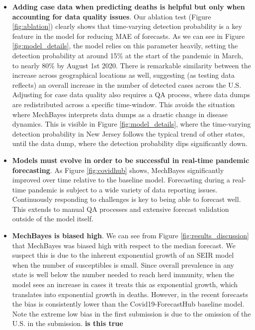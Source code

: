 \documentclass[11pt]{amsart}
\begin{document}
\begin{itemize}
\item \textbf{Adding case data when predicting deaths is helpful but only when accounting for data quality issues}. Our ablation test (Figure \ref{fig:ablation}) clearly shows that time-varying detection probability is a key feature in the model for reducing MAE of forecasts. As we can see in Figure \ref{fig:model_details}, the model relies on this parameter heavily, setting the detection probability at around 15\% at the start of the pandemic in March, to nearly 80\% by August 1st 2020. There is remarkable similarity between the increase across geographical locations as well, suggesting (as testing data reflects) an overall increase in the number of detected cases across the U.S. Adjusting for case data quality also requires a QA process, where data dumps are redistributed across a specific time-window. This avoids the situation where MechBayes interprets data dumps as a drastic change in disease dynamics. This is visible in Figure \ref{fig:model_details}, where the time-varying detection probability in New Jersey follows the typical trend of other states, until the data dump, where the detection probability dips significantly down.


\item \textbf{Models must evolve in order to be successful in real-time pandemic forecasting}. As Figure \ref{fig:covidhub} shows, MechBayes significantly improved over time relative to the baseline model. Forecasting during a real-time pandemic is subject to a wide variety of data reporting issues. Continuously responding to challenges is key to being able to forecast well. This extends to manual QA processes and extensive forecast validation outside of the model itself. 

\item \textbf{MechBayes is biased high}. We can see from Figure \ref{fig:results_discussion} that MechBayes was biased high with respect to the median forecast. We suspect this is due to the inherent exponential growth of an SEIR model when the number of susceptibles is small. Since overall prevalence in any state is well below the number needed to reach herd immunity, when the model sees an increase in cases it treats this as exponential growth, which translates into exponential growth in deaths. However, in the recent forecasts the bias is consistently lower than the Covid19-ForecastHub baseline model. Note the extreme low bias in the first submission is due to the omission of the U.S. in the submission. \textbf{is this true} 


\end{itemize}
\end{document}
